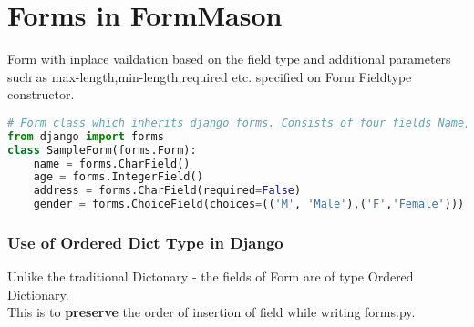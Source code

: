 \section{Forms in FormMason}
Form with inplace vaildation based on the field type and additional parameters such as max-length,min-length,required etc. specified on Form Fieldtype constructor.\\
\begin{lstlisting}[language=python,numbers=none]
# Form class which inherits django forms. Consists of four fields Name,Age,Address and Gender
from django import forms
class SampleForm(forms.Form):
	name = forms.CharField()
	age = forms.IntegerField()
	address = forms.CharField(required=False)
	gender = forms.ChoiceField(choices=(('M', 'Male'),('F','Female')))
\end{lstlisting}
\subsubsection{Use of Ordered Dict Type in Django}
Unlike the traditional Dictonary - the fields of Form are of type Ordered Dictionary.\\
This is to \textbf{preserve} the order of insertion of field while writing forms.py.

